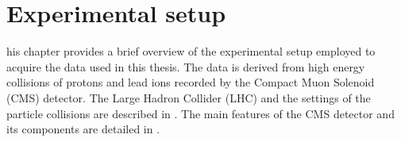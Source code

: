 \let\textcircled=\pgftextcircled
\chapter{Experimental setup} \label{sec:Experiment}

his chapter provides a brief overview of the experimental setup employed to acquire the data used in this thesis. The data is derived from high energy collisions of protons and lead ions  recorded by the Compact Muon Solenoid (CMS) detector. The Large Hadron Collider (LHC) and the settings of the particle collisions are described in . The main features of the CMS detector and its components are detailed in .




\clearpage
